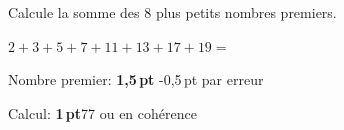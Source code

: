 
\question[2\half]
Calcule la somme des 8 plus petits nombres premiers.

\vspace{10pt}{\footnotesize\raggedleft Espace pour ta démarche et tes calculs\par}
	\begin{solutionorgrid}[100pt]
	
		\vspace{10pt}
		$2 + 3 + 5 + 7 + 11 + 13 + 17 + 19 = $
		
		\vspace{10pt}Nombre premier: \textbf{1,5\,pt} -0,5\,pt par erreur
		
		Calcul: \textbf{1\,pt}77 ou en cohérence
	\end{solutionorgrid}

